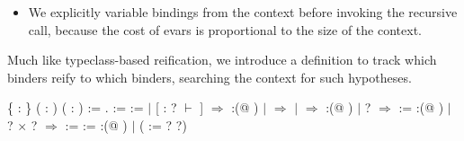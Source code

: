 \begin{itemize}
\item  We explicitly  variable bindings from the context before
      invoking the recursive call, because the cost of evars is
      proportional to the size of the context.  
\end{itemize}


 Much like typeclass-based reification, we introduce a definition
    to track which  binders reify to which  binders,
    searching the context for such hypotheses. \begin{coqdoccode}
\coqdocemptyline
\coqdocnoindent
{}  \{ : \} ( : ) ( : ) := .\coqdoceol
\coqdocemptyline
\coqdocnoindent
{}    :=\coqdoceol
\coqdocindent{1.00em}
   :=    \coqdoceol
\coqdocindent{1.00em}
  \coqdoceol
\coqdocindent{1.00em}
\ensuremath{|} [  :   ? \ensuremath{\vdash} \coqdocvar{\_} ]\coqdoceol
\coqdocindent{2.00em}
\ensuremath{\Rightarrow} :(@  )\coqdoceol
\coqdocindent{1.00em}
\ensuremath{|} \coqdocvar{\_}\coqdoceol
\coqdocindent{2.00em}
\ensuremath{\Rightarrow}\coqdoceol
\coqdocindent{2.00em}
  \coqdoceol
\coqdocindent{2.00em}
\ensuremath{|}  \ensuremath{\Rightarrow} :(@ )\coqdoceol
\coqdocindent{2.00em}
\ensuremath{|}  ?\coqdoceol
\coqdocindent{3.00em}
\ensuremath{\Rightarrow}   :=   \coqdoceol
\coqdocindent{4.50em}
:(@  )\coqdoceol
\coqdocindent{2.00em}
\ensuremath{|} ? \ensuremath{\times} ?\coqdoceol
\coqdocindent{3.00em}
\ensuremath{\Rightarrow}   :=   \coqdoceol
\coqdocindent{4.50em}
  :=   \coqdoceol
\coqdocindent{4.50em}
:(@   )\coqdoceol
\coqdocindent{2.00em}
\ensuremath{|} (  := ?  ?)\coqdoceol

\end{coqdoccode}
